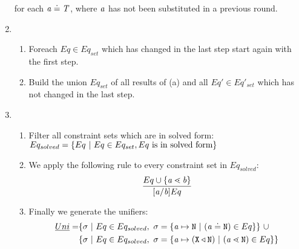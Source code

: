 \begin{enumerate}
      for each $\mathit{ a } \doteq \mathit{T}$, where $\mathit{ a }$ has not been substituted in a previous round.

\item 
    \begin{enumerate}
    \item Foreach $Eq \in Eq_{set}$ which has changed in the last step
      start again with the first step.
    \item Build the union $Eq_{set}$ of all results of (a) and all $Eq' \in
      Eq'_{set}$ which has not changed in the last step.
    \end{enumerate}
\item
\begin{enumerate}
  \item Filter all constraint sets which are in solved
  form:\\
$Eq_{solved} = \{  Eq \ | \ Eq \in Eq_{set}, Eq \ \text{is in solved form} \}$
\item We apply the following rule to every constraint set in $Eq_{solved}$:
\begin{align*}
\ddfrac{
  Eq \cup \set{ \tv{a} \lessdot \tv{b} } %
}{
  [\tv{a}/\tv{b}]Eq
}
\end{align*}
\item Finally we generate the unifiers:
\begin{align*}
    \emph{Uni} = &
   \{ \sigma \ | \ Eq \in Eq_{solved},\ \sigma = \{ \mathit{ a } \mapsto \texttt{N} \ | \ (\mathit{ a } \doteq \texttt{N}) \in Eq \}  \} \ \cup \\
   & \{ \sigma \ | \ Eq \in Eq_{solved},\ \sigma = \{ \mathit{ a } \mapsto (\texttt{X} \triangleleft \texttt{N}) \ | \ (\mathit{ a } \lessdot \texttt{N}) \in Eq \}  \}
\end{align*}
\end{enumerate}
\end{enumerate}

